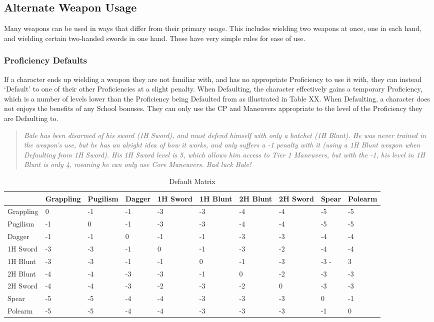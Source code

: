 \documentclass[oneside,11pt,english]{book}
\begin{document}
\subsection{Alternate Weapon Usage}
Many weapons can be used in ways that differ from their primary usage. This includes wielding two 
weapons at once, one in each hand, and wielding certain two-handed swords in one hand. These have very 
simple rules for ease of use. 

\subsubsection{Proficiency Defaults}
If a character ends up wielding a weapon they are not familiar with, and has no appropriate Proficiency to 
use it with, they can instead ‘Default’ to one of their other Proficiencies at a slight penalty. When 
Defaulting, the character effectively gains a temporary Proficiency, which is a number of levels lower 
than the Proficiency being Defaulted from as illustrated in Table XX. When Defaulting, a character does 
not enjoys the benefits of any School bonuses. They can only use the CP and Maneuvers appropriate to 
the level of the Proficiency they are Defaulting to. 

\begin{quote}
	\emph{Bale has been disarmed of his sword (1H Sword), and must defend himself with only a hatchet (1H Blunt). He was never trained in the weapon’s use, but he has an alright idea of how it works, and only suffers a -1 penalty with it (using a 1H Blunt weapon when Defaulting from 1H Sword). His 1H Sword level is 5, which allows him access to Tier 1 Maneuvers, but with the -1, his level in 1H Blunt is only 4, meaning he can only use Core Maneuvers. Bad luck Bale! }
\end{quote}

\begin{table}
	\centering
	\caption{Default Matrix}
	\label{tab:Default Matrix}
	\begin{tabu} spread 0pt {*{10}{X[-1,c]}}
&Grappling &Pugilism &Dagger &1H Sword &1H Blunt &2H Blunt &2H Sword &Spear &Polearm\\\toprule
Grappling &0 &-1 &-1 &-3 &-3 &-4 &-4 &-5 &-5\\
Pugilism &-1 &0 &-1 &-3 &-3 &-4 &-4 &-5 &-5\\
Dagger &-1 &-1 &0 &-1 &-1 &-3 &-3 &-4 &-4\\
1H Sword &-3 &-3 &-1 &0 &-1 &-3 &-2 &-4 &-4\\
1H Blunt &-3 &-3 &-1 &-1 &0 &-1 &-3 &-3 -&3\\
2H Blunt &-4 &-4 &-3 &-3 &-1 &0 &-2 &-3 &-3\\
2H Sword &-4 &-4 &-3 &-2 &-3 &-2 &0 &-3 &-3\\
Spear &-5 &-5 &-4 &-4 &-3 &-3 &-3 &0 &-1\\
Polearm &-5 &-5 &-4 &-4 &-3 &-3 &-3 &-1 &0\\
	\end{tabu}
\end{table}
\end{document}
